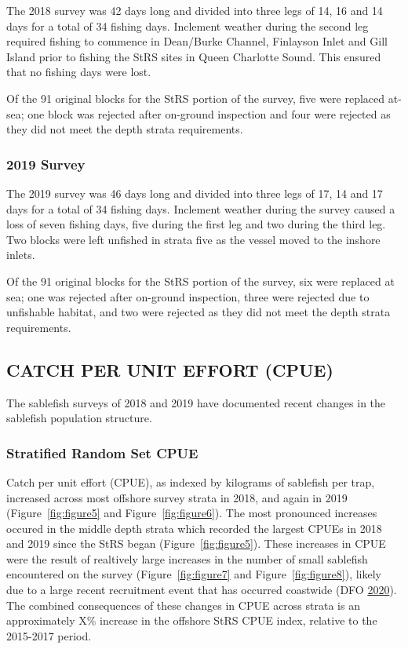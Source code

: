 \documentclass[12pt]{article}\usepackage[]{graphicx}\usepackage[]{color}
\begin{document}
The 2018 survey was 42 days long and divided into three legs of 14, 16 and 14 days for a total of 34 fishing days. Inclement weather during the second leg required fishing to commence in Dean/Burke Channel, Finlayson Inlet and Gill Island prior to fishing the StRS sites in Queen Charlotte Sound. This ensured that no fishing days were lost.

Of the 91 original blocks for the StRS portion of the survey, five were replaced at-sea; one block was rejected after on-ground inspection and four were rejected as they did not meet the depth strata requirements.

\hypertarget{survey-1}{%
\subsubsection{2019 Survey}\label{survey-1}}

The 2019 survey was 46 days long and divided into three legs of 17, 14 and 17 days for a total of 34 fishing days. Inclement weather during the survey caused a loss of seven fishing days, five during the first leg and two during the third leg. Two blocks were left unfished in strata five as the vessel moved to the inshore inlets.

Of the 91 original blocks for the StRS portion of the survey, six were replaced at sea; one was rejected after on-ground inspection, three were rejected due to unfishable habitat, and two were rejected as they did not meet the depth strata requirements.

\hypertarget{catch-per-unit-effort-cpue}{%
\subsection{CATCH PER UNIT EFFORT (CPUE)}\label{catch-per-unit-effort-cpue}}

The sablefish surveys of 2018 and 2019 have documented recent changes in the sablefish population structure.

\hypertarget{stratified-random-set-cpue}{%
\subsubsection{Stratified Random Set CPUE}\label{stratified-random-set-cpue}}

Catch per unit effort (CPUE), as indexed by kilograms of sablefish per trap, increased across most offshore survey strata in 2018, and again in 2019 (Figure~\ref{fig:figure5} and Figure~\ref{fig:figure6}). The most pronounced increases occured in the middle depth strata which recorded the largest CPUEs in 2018 and 2019 since the StRS began (Figure~\ref{fig:figure5}). These increases in CPUE were the result of realtively large increases in the number of small sablefish encountered on the survey (Figure~\ref{fig:figure7} and Figure~\ref{fig:figure8}), likely due to a large recent recruitment event that has occurred coastwide (DFO \protect\hyperlink{ref-DFO2020}{2020}). The combined consequences of these changes in CPUE across strata is an approximately X\% increase in the offshore StRS CPUE index, relative to the 2015-2017 period.
\end{document}

